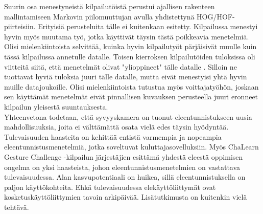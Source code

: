 Suurin osa menestyneistä kilpailutöistä perustui ajallisen rakenteen mallintamiseen Markovin piilomuuttujan avulla yhdistettynä HOG/HOF-piirteisiin. 
Erityisiä perusteluita tälle ei kuitenkaan esitetty. Kilpailussa menestyi hyvin myös muutama työ, jotka käyttivät täysin tästä poikkeavia menetelmiä.\\

Olisi mielenkiintoista selvittää, kuinka hyvin kilpailutyöt pärjäisivät muulle kuin tässä kilpailussa annetulle datalle. 
Toisen kierroksen kilpailutöiden tuloksissa oli viitteitä siitä, että menetelmät olivat "ylioppineet"  tälle datalle \citep {chalearn2}. 
Silloin ne tuottavat hyviä tuloksia juuri tälle datalle, mutta eivät menestyisi yhtä hyvin muille datajoukoille. Olisi mielenkiintoista 
tutustua myös voittajatyöhön, joskaan sen käyttämät menetelmät eivät pinnallisen kuvauksen perusteella juuri eronneet kilpailun yleisestä suuntauksesta.\\

Yhteenvetona todetaan, että syvyyskamera on tuonut eleentunnistukseen uusia mahdollisuuksia, joita ei välttämättä osata vielä edes täysin hyödyntää.
Tulevaisuuden haasteita on kehittää entistä varmempia ja nopeampia eleentunnistusmenetelmiä, jotka soveltuvat kuluttajasovelluksiin.
Myös ChaLearn Gesture Challenge -kilpailun järjestäjien esittämä yhdestä eleestä oppimisen ongelma on yksi haasteista, johon eleentunnistusmenetelmien on 
vastattava tulevaisuudessa. Alan kasvupotentiaali on huikea, sillä eleentunnistuksella on paljon käyttökohteita. Ehkä tulevaisuudessa elekäyttöliittymät
ovat kosketuskäyttöliittymien tavoin arkipäivää. Lisätutkimusta on kuitenkin vielä tehtävä.\\








